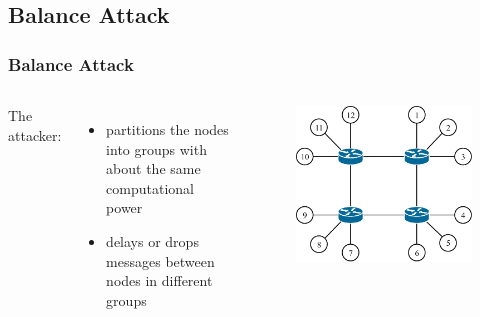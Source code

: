 \documentclass[pdf]{beamer}
\begin{document}
\subsection{Balance Attack}
\begin{frame}
	\frametitle{Balance Attack}
	\begin{columns}
		The attacker:
		\begin{itemize}
			\item partitions the nodes into groups with about the same computational power
			\item delays or drops messages between nodes in different groups
		\end{itemize}
																																
		\centering
		\hspace*{-3mm}										
		\begin{figure}
			\begin{overprint}
				\hspace{1.4mm}
				\includegraphics[scale=0.5]{figures/balance_1}
				\onslide<2>

\end{overprint}
\end{figure}
\end{columns}
\end{frame}
\end{document}
